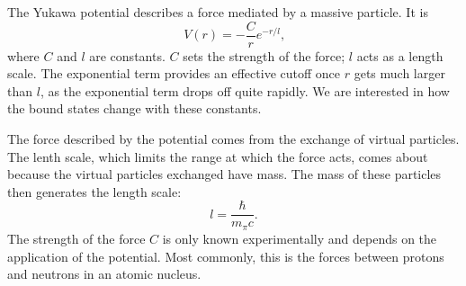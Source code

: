 \documentclass[12pt,twoside]{reedthesis}
\newcommand{\eqn}[1]{\begin{equation}#1\end{equation}}
\begin{document}
The Yukawa potential describes a force mediated by a massive particle. It is %
\eqn{
V(r) = -\frac{C}{r}e^{-r/l}\mbox{,}
}
where $C$ and $l$ are constants. $C$ sets the strength of the force; $l$ acts as a length scale. The exponential term provides an effective cutoff once $r$ gets much larger than $l$, as the exponential term drops off quite rapidly. We are interested in how the bound states change with these constants. 

The force described by the potential comes from the exchange of virtual particles. The lenth scale, which limits the range at which the force acts, comes about because the virtual particles exchanged have mass. The mass of these particles then generates the length scale:
\eqn{
l = \frac{\hbar}{m_{\pi}c}\mbox{.}
}
The strength of the force $C$ is only known experimentally and depends on the application of the potential. Most commonly, this is the forces between protons and neutrons in an atomic nucleus.
\end{document}
